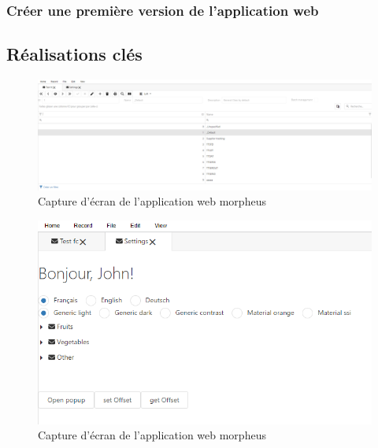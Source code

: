 \documentclass[a4paper, 12pt, french]{article}
\begin{document}
				\subsubsection{Créer une première version de l'application web}
					
				
			\subsection{Réalisations clés}
			
			
				\begin{figure}[h!]
					\begin{center}
						\includegraphics[width=0.7\linewidth]{images/mph_web_reactts_1.png}
					\end{center}
					\caption{Capture d'écran de l'application web morpheus}
					\label{fig:mph_web1}
				\end{figure}

				\begin{figure}[h!]
					\begin{center}
						\includegraphics[width=0.7\linewidth]{images/mph_web_reactts_2.png}
					\end{center}
					\caption{Capture d'écran de l'application web morpheus}
					\label{fig:mph_web2}
				\end{figure}
				
\end{document}
